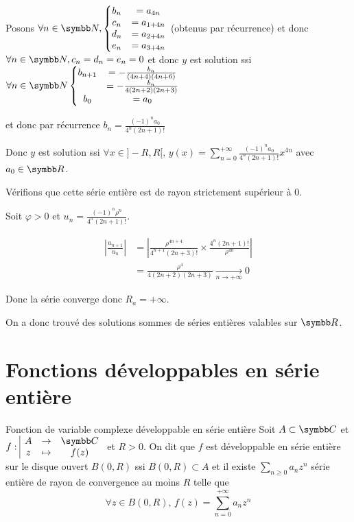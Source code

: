 \begin{exemple}
    Posons $\forall n \in \N, \left\{ 
        \begin{matrix}
            b_n & = a_{4 n } \\
            c_n & = a_{ 1 + 4n} \\
            d_n & = a_{2 + 4n} \\
            e_n & = a_{3 + 4n}
        \end{matrix}
    \right.$ (obtenus par récurrence) et donc 
    $\forall n \in \N, c_n = d_n = e_n = 0$ et donc $y$ est solution ssi 
    $\forall n \in \N \left\{
        \begin{matrix}
            b_{n + 1} & = - \frac{b_n }{(4n + 4)(4n + 6)} \\
            & = - \frac{b_n }{4(2n + 2)(2n + 3)} \\
            b_0 & = a_0
        \end{matrix}
    \right.$

    et donc par récurrence $ b_n = \frac{(-1)^n a_0}{4^n(2n + 1)!}$
    
    Donc $y$ est solution ssi $\forall x \in ]-R, R[, \, y(x) = \sum_{n = 0}^{+\infty} \frac{(-1)^n a_0}{4^n (2n + 1)!} x^{4n}$
    avec $a_0 \in \R$. 

    Vérifions que cette série entière est de rayon strictement supérieur à 0.

    Soit $\varphi > 0$ et $u_n = \frac{(-1)^n \rho^n}{4^n (2n + 1)!}$.

    \begin{align}
        \left| \frac{u_{n + 1}}{u_n} \right| & = \left| \frac{\rho^{4n + 4}}{4^{n + 1} (2n + 3)!} \times \frac{4^n (2n + 1)!}{\rho^{4n} } \right| \\
        & = \frac{\rho^4 }{4 (2n + 2)(2n + 3)} \xrightarrow[n \to + \infty]{} 0
    \end{align}

    Donc la série converge donc $R_a = + \infty$.

    On a donc trouvé des solutions sommes de séries entières valables sur $\R$.
\end{exemple}

\section{Fonctions développables en série entière}

\begin{definitionnt}{Fonction de variable complexe développable en série entière}{}
    Soit $A \subset \C$ et $\fonction{f}{A}{\C}{z}{f(z)}$ et $R > 0$. On dit que $f$ est développable
    en série entière sur le disque ouvert $B(0, R)$ ssi $B(0, R) \subset A$ et il 
    existe $\sum_{n \geqslant 0 } a_n z^n$ série entière de rayon de convergence au moins $R$ telle que
    $$\forall z \in B(0, R), \, f(z) = \sum_{n = 0}^{+\infty} a_n z^n$$
\end{definitionnt}

